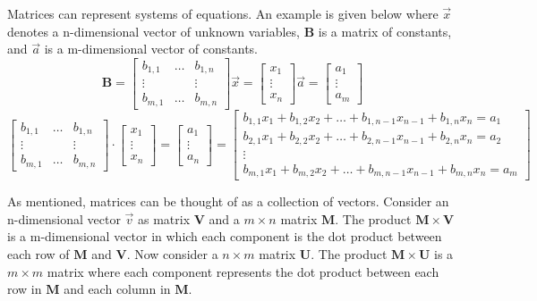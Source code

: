 \documentclass[12pt]{article}
\begin{document}
Matrices can represent systems of equations. An example is given below where $\vec{x}$ denotes a n-dimensional vector of unknown variables, $\mathbf{B}$ is a matrix of constants, and $\vec{a}$ is a m-dimensional vector of constants. 
\[
\mathbf{B} = 
\begin{bmatrix}
  b_{1,1} & \ldots & b_{1,n} \\
  \vdots &  & \vdots \\
  b_{m,1} & \ldots & b_{m,n}
 \end{bmatrix}
 \vec{x} = 
 \begin{bmatrix}
 x_{1} \\
 \vdots \\
 x_{n}
 \end{bmatrix}
 \vec{a} = 
 \begin{bmatrix}
 a_{1} \\
 \vdots \\
 a_{m}
 \end{bmatrix}
\]
\[
\begin{bmatrix}
  b_{1,1} & \ldots & b_{1,n} \\
  \vdots &  & \vdots \\
  b_{m,1} & \ldots & b_{m,n}
 \end{bmatrix}
\cdot
 \begin{bmatrix}
 x_{1} \\
 \vdots \\
 x_{n}
 \end{bmatrix}
 = 
 \begin{bmatrix}
 a_{1} \\
 \vdots \\
 a_{n}
 \end{bmatrix}
 =
 \begin{bmatrix}
 b_{1,1} x_{1} + b_{1,2} x_{2} + \ldots + b_{1,n-1} x_{n-1} + b_{1,n} x_{n} = a_{1}\\
  b_{2,1} x_{1} + b_{2,2} x_{2} + \ldots + b_{2,n-1} x_{n-1} + b_{2,n} x_{n} = a_{2} \\
  \vdots \\
   b_{m,1} x_{1} + b_{m,2} x_{2} + \ldots + b_{m,n-1} x_{n-1} + b_{m,n} x_{n} = a_{m}
 \end{bmatrix}
 \]

As mentioned, matrices can be thought of as a collection of vectors. Consider an n-dimensional vector $\vec{v}$ as matrix $\mathbf{V}$ and a $m\times n$ matrix $\mathbf{M}$. The product $\mathbf{M}\times\mathbf{V}$ is a m-dimensional vector in which each component is the dot product between each row of $\mathbf{M}$ and $\mathbf{V}$. Now consider a $n\times m$ matrix $\mathbf{U}$. The product $\mathbf{M}\times\mathbf{U}$ is a $m\times m$ matrix where each component represents the dot product between each row in $\mathbf{M}$ and each column in $\mathbf{M}$. \\
\end{document}
